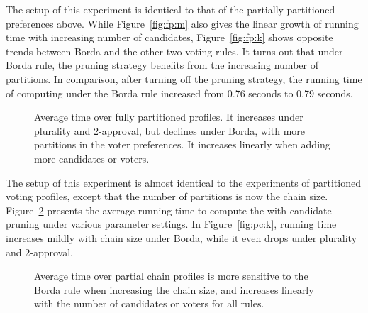  The setup of this experiment is identical to that of the partially partitioned preferences above.
While Figure~\ref{fig:fp:m} also gives the linear  growth of running time with increasing number of candidates, Figure~\ref{fig:fp:k} shows opposite trends between Borda and the other two voting rules. It turns out that under Borda rule, the pruning strategy benefits from the increasing number of partitions.
In comparison, after turning off the pruning strategy, the running time of computing \mew under the Borda rule increased from 0.76 seconds to 0.79 seconds.

\begin{figure}[tb!]
	\centering
	\hfill
	\hfill
	\hfill
	\caption{Average time over fully partitioned profiles. It increases under plurality and 2-approval, but declines under Borda, with more partitions in the voter preferences. It increases linearly when adding more candidates or voters.}
	\label{fig:fp}
\end{figure}

 The setup of this experiment is almost identical to the experiments of partitioned voting profiles, except that the number of partitions is now the chain size. Figure~\ref{fig:pc} presents the average running time to compute the \mew with candidate pruning under various parameter settings.
In Figure~\ref{fig:pc:k}, running time increases mildly with chain size under Borda, while it even drops under plurality and 2-approval. 

\begin{figure}[tb!]
	\centering
	\hfill
	\hfill
	\hfill
	\caption{Average time over partial chain profiles is more sensitive to the Borda rule when increasing the chain size, and increases linearly with the number of candidates or voters for all rules.}
	\label{fig:pc}
\end{figure}

